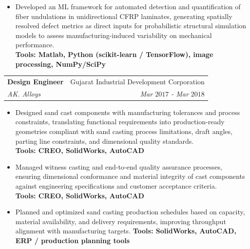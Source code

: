 \documentclass[a4paper,20pt]{article}
\makeatletter
\newcommand{\resumeSubheading}[4]{
  \vspace{-1pt}\item
    \begin{tabular*}{0.97\textwidth}{l@{\extracolsep{\fill}}r}
      \textbf{#1} & #2 \\
      \textit{#3} & \textit{#4} \\
    \end{tabular*}\vspace{-5pt}
}
\newcommand{\resumeItemListStart}{\begin{itemize}}
\newcommand{\resumeItemListEnd}{\end{itemize}\vspace{-5pt}}
\makeatother
\begin{document}
    \resumeItemListStart
    

    \item Developed an ML framework for automated detection and quantification of fiber undulations in unidirectional CFRP laminates, generating spatially resolved defect metrics as direct inputs for probabilistic structural simulation models to assess manufacturing-induced variability on mechanical performance.
    \\
    \textbf{Tools: Matlab, Python (scikit-learn / TensorFlow), image processing, NumPy/SciPy}
    
\resumeItemListEnd
\vspace{10pt}

    \resumeSubheading
    {Design Engineer }{Gujarat Industrial Development Corporation}
    {AK. Alloys}{Mar $2017$ - Mar $2018$}
    \resumeItemListStart
   \item Designed sand cast components with manufacturing tolerances and process constraints, translating functional requirements into production-ready geometries compliant with sand casting process limitations, draft angles, parting line constraints, and dimensional quality standards.
       \\
    \textbf{Tools: CREO, SolidWorks, AutoCAD}

\item Managed witness casting and end-to-end quality assurance processes, ensuring dimensional conformance and material integrity of cast components against engineering specifications and customer acceptance criteria.
\\
\textbf{Tools: CREO, SolidWorks, AutoCAD}

\item Planned and optimized sand casting production schedules based on capacity, material availability, and delivery requirements, improving throughput alignment with manufacturing targets.
\textbf{Tools: SolidWorks, AutoCAD, ERP / production planning tools}
\resumeItemListEnd
        
		



\renewcommand{\arraystretch}{1.3}
\end{document}

